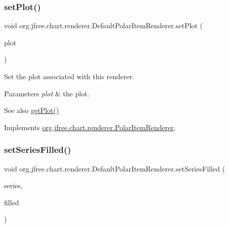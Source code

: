 \subsubsection{\texorpdfstring{set\+Plot()}{setPlot()}}
{\footnotesize\ttfamily void org.\+jfree.\+chart.\+renderer.\+Default\+Polar\+Item\+Renderer.\+set\+Plot (\begin{DoxyParamCaption}\item[{\mbox{\hyperlink{classorg_1_1jfree_1_1chart_1_1plot_1_1_polar_plot}{Polar\+Plot}}}]{plot }\end{DoxyParamCaption})}

Set the plot associated with this renderer.


\begin{DoxyParams}{Parameters}
{\em plot} & the plot.\\
\hline
\end{DoxyParams}
\begin{DoxySeeAlso}{See also}
\mbox{\hyperlink{classorg_1_1jfree_1_1chart_1_1renderer_1_1_default_polar_item_renderer_a9cd32aebbc67cd428f05aafd7cb2c3ff}{get\+Plot()}} 
\end{DoxySeeAlso}


Implements \mbox{\hyperlink{interfaceorg_1_1jfree_1_1chart_1_1renderer_1_1_polar_item_renderer_a1b4dbb3579dbdf195cb5dc0901d387f5}{org.\+jfree.\+chart.\+renderer.\+Polar\+Item\+Renderer}}.

\mbox{\label{classorg_1_1jfree_1_1chart_1_1renderer_1_1_default_polar_item_renderer_a9bc668284f645601f433cac0b8baa4c8}} 
\subsubsection{\texorpdfstring{set\+Series\+Filled()}{setSeriesFilled()}}
{\footnotesize\ttfamily void org.\+jfree.\+chart.\+renderer.\+Default\+Polar\+Item\+Renderer.\+set\+Series\+Filled (\begin{DoxyParamCaption}\item[{int}]{series,  }\item[{boolean}]{filled }\end{DoxyParamCaption})}

